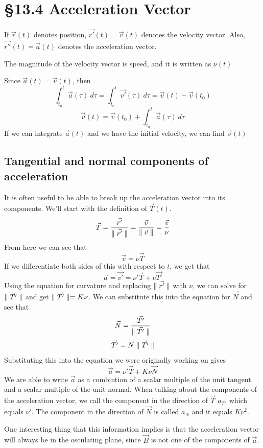 \documentclass[12 pt]{article}
\begin{document}
    \section{\S 13.4 Acceleration Vector}
        If $\vec{r}(t)$ denotes position, $\vec{r'}(t)=\vec{v}(t)$ denotes the velocity vector. Also, $\vec{r''}(t)=\vec{a}(t)$ denotes the acceleration vector.

        The magnitude of the velocity vector is speed, and it is written as $\nu(t)$

        Since $\vec{a}(t)=\vec{v}(t)$, then
        $$\int_{t_0}^t\vec{a}(\tau)\ d\tau=\int_{t_0}^t\vec{v'}(\tau)\ d\tau=\vec{v}(t)-\vec{v}(t_0)$$
        $$\vec{v}(t)=\vec{v}(t_0)+\int_{t_0}^t\vec{a}(\tau)\ d\tau$$
        If we can integrate $\vec{a}(t)$ and we have the initial velocity, we can find $\vec{v}(t)$

        \subsection{Tangential and normal components of acceleration}

        It is often useful to be able to break up the acceleration vector into its components. We'll start with the definition of $\vec{T}(t)$.
        $$\vec{T}=\frac{\vec{r'}}{\parallel \vec{r'} \parallel}=\frac{\vec{v}}{\parallel \vec{v} \parallel}=\frac{\vec{v}}{\nu}$$
        From here we can see that
        $$\vec{v}=\nu\vec{T}$$
        If we differentiate both sides of this with respect to $t$, we get that
        $$\vec{a}=\vec{v'}=\nu'\vec{T}+\nu\vec{T'}$$
        Using the equation for curvature and replacing $\parallel \vec{r'} \parallel$ with $\nu$, we can solve for $\parallel \vec{T'} \parallel$ and get $\parallel \vec{T'} \parallel=K\nu$. We can substitute this into the equation for $\vec{N}$ and see that
        $$\vec{N}=\frac{\vec{T'}}{\parallel \vec{T'} \parallel}$$
        $$\vec{T'}=\vec{N}\parallel \vec{T'} \parallel$$
        Substituting this into the equation we were originally working on gives
        $$\vec{a}=\nu'\vec{T}+K\nu\vec{N}$$
        We are able to write $\vec{a}$ as a combintion of a scalar multiple of the unit tangent and a scalar multiple of the unit normal. When talking about the components of the acceleration vector, we call the component in the direction of $\vec{T}$ $a_T$, which equals $\nu'$. The component in the direction of $\vec{N}$ is called $a_N$ and it equals $K\nu^2$.

        One interesting thing that this information implies is that the acceleration vector will always be in the osculating plane, since $\vec{B}$ is not one of the components of $\vec{a}$.
\end{document}
